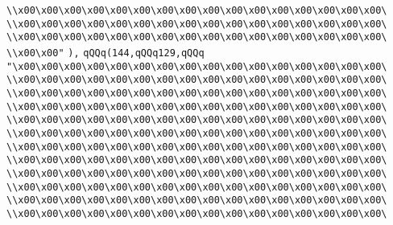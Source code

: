 \verb|\\x00\x00\x00\x00\x00\x00\x00\x00\x00\x00\x00\x00\x00\x00\x00\x00\|\newline
\verb|\\x00\x00\x00\x00\x00\x00\x00\x00\x00\x00\x00\x00\x00\x00\x00\x00\|\newline
\verb|\\x00\x00\x00\x00\x00\x00\x00\x00\x00\x00\x00\x00\x00\x00\x00\x00\|\newline
\verb|\\x00\x00"|\newline
\verb|),|\newline
\verb|qQQq(144,qQQq129,qQQq|\newline
\verb|"\x00\x00\x00\x00\x00\x00\x00\x00\x00\x00\x00\x00\x00\x00\x00\x00\|\newline
\verb|\\x00\x00\x00\x00\x00\x00\x00\x00\x00\x00\x00\x00\x00\x00\x00\x00\|\newline
\verb|\\x00\x00\x00\x00\x00\x00\x00\x00\x00\x00\x00\x00\x00\x00\x00\x00\|\newline
\verb|\\x00\x00\x00\x00\x00\x00\x00\x00\x00\x00\x00\x00\x00\x00\x00\x00\|\newline
\verb|\\x00\x00\x00\x00\x00\x00\x00\x00\x00\x00\x00\x00\x00\x00\x00\x00\|\newline
\verb|\\x00\x00\x00\x00\x00\x00\x00\x00\x00\x00\x00\x00\x00\x00\x00\x00\|\newline
\verb|\\x00\x00\x00\x00\x00\x00\x00\x00\x00\x00\x00\x00\x00\x00\x00\x00\|\newline
\verb|\\x00\x00\x00\x00\x00\x00\x00\x00\x00\x00\x00\x00\x00\x00\x00\x00\|\newline
\verb|\\x00\x00\x00\x00\x00\x00\x00\x00\x00\x00\x00\x00\x00\x00\x00\x00\|\newline
\verb|\\x00\x00\x00\x00\x00\x00\x00\x00\x00\x00\x00\x00\x00\x00\x00\x00\|\newline
\verb|\\x00\x00\x00\x00\x00\x00\x00\x00\x00\x00\x00\x00\x00\x00\x00\x00\|\newline
\verb|\\x00\x00\x00\x00\x00\x00\x00\x00\x00\x00\x00\x00\x00\x00\x00\x00\|\newline
